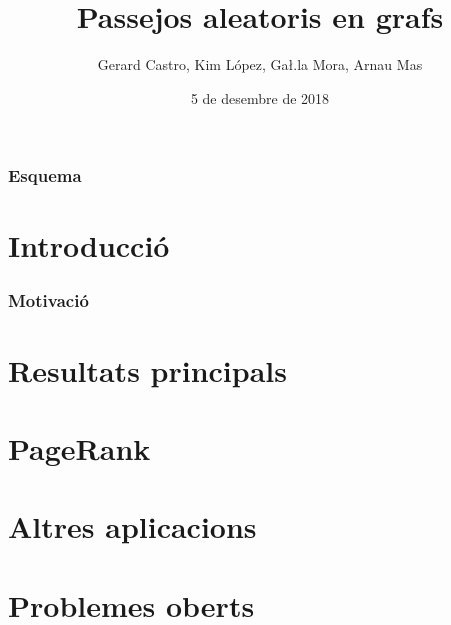 \documentclass[aspectratio=169, 14pt]{beamer}
\title{Passejos aleatoris en grafs}
\author{Gerard Castro, Kim López, Ga\l.la Mora, Arnau Mas}
\date{5 de desembre de 2018}
\begin{document}
\begin{frame}
\titlepage
\end{frame}

\begin{frame}
\frametitle{Esquema}
\tableofcontents

\end{frame}

\section{Introducció}

\begin{frame}
\frametitle{Motivació}
\end{frame}

\section{Resultats principals}

\section{PageRank}

\section{Altres aplicacions}

\section{Problemes oberts}
\end{document}
